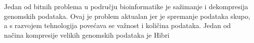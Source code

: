 Jedan od bitnih problema u području bioinformatike je sažimanje i dekompresija genomskih podataka. Ovaj je problem aktualan jer je spremanje podataka skupo, a s razvojem tehnologija povećava se važnost i količina podataka. Jedan od načina kompresije velikih genomskih podataka je Hibri